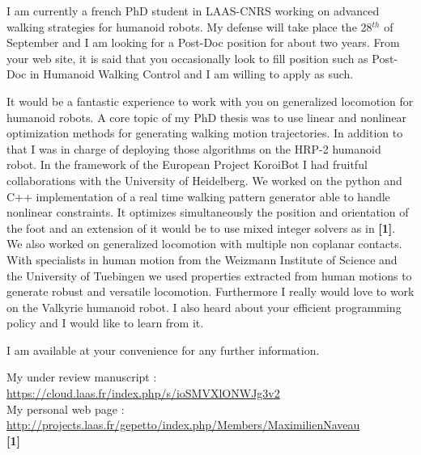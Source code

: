 \documentclass[10pt,stdletter,dateno,sigleft]{newlfm} %
\begin{document}
\begin{newlfm}


I am currently a french PhD student in LAAS-CNRS working on advanced walking strategies for humanoid robots.
My defense will take place the 28$^{th}$ of September and I am looking for a Post-Doc position for about two years.
From your web site, it is said that you occasionally look to fill position such as Post-Doc in Humanoid Walking Control and I am willing to apply as such.

It would be a fantastic experience to work with you on generalized locomotion for humanoid robots.
A core topic of my PhD thesis was to use linear and nonlinear optimization methods for generating walking motion trajectories.
In addition to that I was in charge of deploying those algorithms on the HRP-2 humanoid robot.
In the framework of the European Project KoroiBot I had fruitful collaborations with the University of Heidelberg.
We worked on the python and C++ implementation of a real time walking pattern generator able to handle nonlinear constraints.
It optimizes simultaneously the position and orientation of the foot and an extension of it would be to use mixed integer solvers as in \textbf{[1]}.
We also worked on generalized locomotion with multiple non coplanar contacts.
With specialists in human motion from the Weizmann Institute of Science and the University of Tuebingen we used properties extracted from human motions to generate robust and versatile locomotion.
Furthermore I really would love to work on the Valkyrie humanoid robot.
I also heard about your efficient programming policy and I would like to learn from it.

I am available at your convenience for any further information.

My under review manuscript : \url{https://cloud.laas.fr/index.php/s/ioSMVXlONWJg3v2}\\
My personal web page : \url{http://projects.laas.fr/gepetto/index.php/Members/MaximilienNaveau}\\
\textbf{[1]} \\


\end{newlfm}
\end{document}
